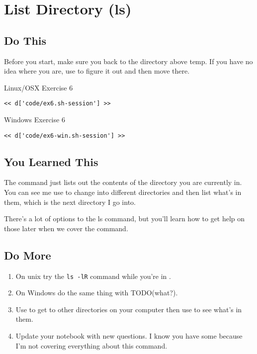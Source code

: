 \chapter{List Directory (ls)}

\section{Do This}

Before you start, make sure you  back to the directory above temp.
If you have no idea where you are, use  to figure it out and then
move there.

\begin{code}{Linux/OSX Exercise 6}
\begin{Verbatim}
<< d['code/ex6.sh-session'] >>
\end{Verbatim}
\end{code}

\begin{code}{Windows Exercise 6}
\begin{Verbatim}
<< d['code/ex6-win.sh-session'] >>
\end{Verbatim}
\end{code}

\section{You Learned This}

The  command just lists out the contents of the directory you
are currently in.  You can see me use  to change into different
directories and then list what's in them, which is the next directory I
go into.

There's a lot of options to the ls command, but you'll learn how to get
help on those later when we cover the  command.

\section{Do More}

\begin{enumerate}
\item On unix try the \verb|ls -lR| command while you're in .
\item On Windows do the same thing with TODO(what?).
\item Use  to get to other directories on your computer then use  to see what's in them.
\item Update your notebook with new questions.  I know you have some because I'm
    not covering everything about this command.
\end{enumerate}

